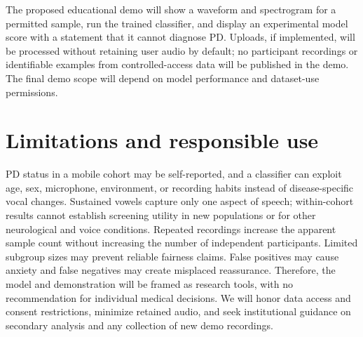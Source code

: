 \documentclass{article}
\begin{document}
The proposed educational demo will show a waveform and spectrogram for a permitted sample, run the trained classifier, and display an experimental model score with a statement that it cannot diagnose PD. Uploads, if implemented, will be processed without retaining user audio by default; no participant recordings or identifiable examples from controlled-access data will be published in the demo. The final demo scope will depend on model performance and dataset-use permissions.

\section{Limitations and responsible use}
PD status in a mobile cohort may be self-reported, and a classifier can exploit age, sex, microphone, environment, or recording habits instead of disease-specific vocal changes. Sustained vowels capture only one aspect of speech; within-cohort results cannot establish screening utility in new populations or for other neurological and voice conditions. Repeated recordings increase the apparent sample count without increasing the number of independent participants. Limited subgroup sizes may prevent reliable fairness claims. False positives may cause anxiety and false negatives may create misplaced reassurance. Therefore, the model and demonstration will be framed as research tools, with no recommendation for individual medical decisions. We will honor data access and consent restrictions, minimize retained audio, and seek institutional guidance on secondary analysis and any collection of new demo recordings.
\end{document}
